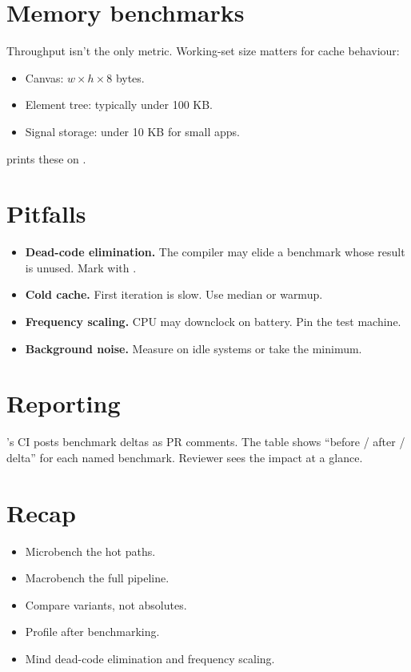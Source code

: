 \section{Memory benchmarks}

Throughput isn't the only metric. Working-set size matters
for cache behaviour:

\begin{itemize}[leftmargin=*]
  \item Canvas: $w \times h \times 8$ bytes.
  \item Element tree: typically under 100 KB.
  \item Signal storage: under 10 KB for small apps.
\end{itemize}

\maya{} prints these on .

\section{Pitfalls}

\begin{itemize}[leftmargin=*]
  \item \textbf{Dead-code elimination.} The compiler may
    elide a benchmark whose result is unused. Mark with
    .
  \item \textbf{Cold cache.} First iteration is slow. Use
    median or warmup.
  \item \textbf{Frequency scaling.} CPU may downclock on
    battery. Pin the test machine.
  \item \textbf{Background noise.} Measure on idle systems
    or take the minimum.
\end{itemize}

\section{Reporting}

\maya{}'s CI posts benchmark deltas as PR comments. The
table shows ``before / after / delta'' for each named
benchmark. Reviewer sees the impact at a glance.

\section{Recap}

\begin{recap}
\begin{itemize}[leftmargin=*]
  \item Microbench the hot paths.
  \item Macrobench the full pipeline.
  \item Compare variants, not absolutes.
  \item Profile after benchmarking.
  \item Mind dead-code elimination and frequency scaling.
\end{itemize}
\end{recap}

